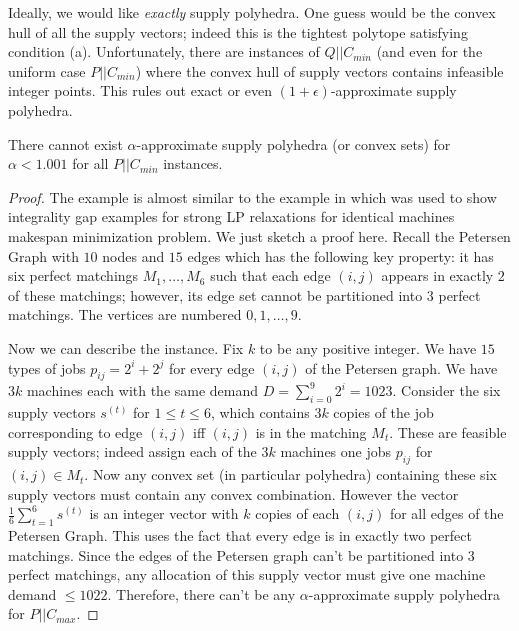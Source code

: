 Ideally, we would like {\em exactly} supply polyhedra. One guess would be the convex hull of all the supply vectors; indeed this is the tightest polytope satisfying condition (a).
Unfortunately, there are instances of $Q||C_{min}$ (and even for the uniform case $P||C_{min}$) where the convex hull of supply vectors contains infeasible integer points.
This rules out exact or even $(1+\epsilon)$-approximate supply polyhedra.
\begin{theorem}\label{fthm:no-supp}
	There cannot exist $\alpha$-approximate supply polyhedra (or convex sets) for $\alpha < 1.001$ for all  $P||C_{min}$ instances.
\end{theorem}
\begin{proof}
The example is almost similar to the example in \cite{KurpiszMMMVW16} which was used to show integrality gap examples for strong LP relaxations for identical machines makespan minimization problem.
We just sketch a proof here. Recall the Petersen Graph with $10$ nodes and $15$ edges which has the following key property: it has six perfect matchings $M_1,\ldots,M_6$ such that each edge $(i,j)$ appears in exactly $2$ of these matchings; however, its edge set cannot be partitioned into $3$ perfect matchings.
The vertices are numbered $0,1,\ldots,9$.

Now we can describe the instance. Fix $k$ to be any positive integer.
We have $15$ types of jobs $p_{ij} = 2^i + 2^j$ for every edge $(i,j)$ of the Petersen graph.
We have $3k$ machines each with the same demand $D = \sum_{i=0}^9 2^i = 1023$.
Consider the six supply vectors $s^{(t)}$ for $1\leq t\leq 6$,  which contains $3k$ copies of the job corresponding to edge $(i,j)$ iff $(i,j)$ is in the matching $M_t$.
These are feasible supply vectors; indeed assign each of the $3k$ machines one jobs $p_{ij}$ for $(i,j) \in M_t$. Now any convex set (in particular polyhedra) containing these six supply vectors
must contain any convex combination. However the vector $\frac{1}{6}\sum_{t=1}^6 s^{(t)}$ is an integer vector with $k$ copies of each $(i,j)$ for all edges of the Petersen Graph.
This uses the fact that every edge is in exactly two perfect matchings. Since the edges of the  Petersen graph can't be partitioned into $3$ perfect matchings, any allocation of this supply vector
must give one machine demand $\leq 1022$. Therefore, there can't be any $\alpha$-approximate supply polyhedra for $P||C_{max}$.
\end{proof}
